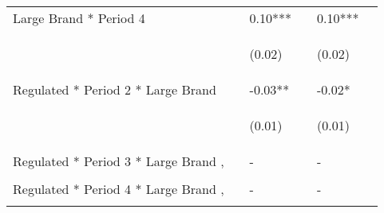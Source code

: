 \documentclass[12pt]{article}
\begin{document}
\begin{center}
\begin{longtable}{p{}p{}p{}p{}p{}p{}}
Large Brand * Period 4 &  & 0.10*** &  & 0.10*** \\
\vspace{2pt} & \begin{footnotesize}\end{footnotesize} & \begin{footnotesize}(0.02)\end{footnotesize} & \begin{footnotesize}\end{footnotesize} & \begin{footnotesize}(0.02)\end{footnotesize} \\
Regulated * Period 2 * Large Brand &  & -0.03** &  & -0.02* \\
\vspace{2pt} & \begin{footnotesize}\end{footnotesize} & \begin{footnotesize}(0.01)\end{footnotesize} & \begin{footnotesize}\end{footnotesize} & \begin{footnotesize}(0.01)\end{footnotesize} \\
Regulated * Period 3 * Large Brand , &  & - &  & - \\
\vspace{2pt} & \begin{footnotesize}\end{footnotesize} & \begin{footnotesize}\end{footnotesize} & \begin{footnotesize}\end{footnotesize} & \begin{footnotesize}\end{footnotesize} \\
Regulated * Period 4 * Large Brand , &  & - &  & - \\
\vspace{2pt} & \begin{footnotesize}\end{footnotesize} & \begin{footnotesize}\end{footnotesize} & \begin{footnotesize}\end{footnotesize} & \begin{footnotesize}\end{footnotesize} \\

\end{longtable}
\end{center}
\end{document}
